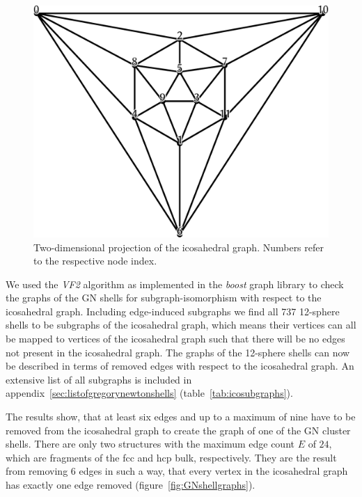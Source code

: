 \begin{figure}
    \centering
    \includegraphics[width=.8\textwidth]{gregory-newton/ico.pdf}
    \caption{Two-dimensional projection of the icosahedral graph. Numbers refer
    to the respective node index.}
    \label{fig:icograph}
\end{figure}

We used the \textit{VF2} algorithm\autocite{Cordella_SubGraphIsomorphism_2004}
as implemented in the \textit{boost} graph library\autocite{_boost_2002} to
check the graphs of the \ac{GN} shells for subgraph-isomorphism with respect to
the icosahedral graph. Including edge-induced subgraphs we find all 737
12-sphere shells to be subgraphs of the icosahedral graph, which means their
vertices can all be mapped to vertices of the icosahedral graph such that there
will be no edges not present in the icosahedral graph. The graphs of the
12-sphere shells can now be described in terms of removed edges with respect to
the icosahedral graph. An extensive list of all subgraphs is included in
appendix~\ref{sec:listofgregorynewtonshells} (table~\ref{tab:icosubgraphs}).

The results show, that at least six edges and up to a maximum of nine have to
be removed from the icosahedral graph to create the graph of one of the \ac{GN}
cluster shells. There are only two structures with the maximum edge count $E$
of $24$, which are fragments of the \ac{fcc} and hcp bulk, respectively. They are
the result from removing 6 edges in such a way, that every vertex in the
icosahedral graph has exactly one edge removed (figure~\ref{fig:GNshellgraphs}).

